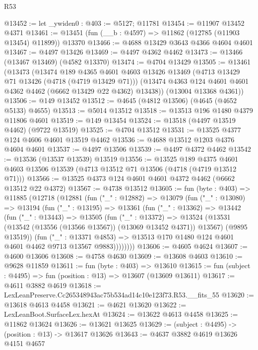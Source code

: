 \begin{lexlean}{R53}
\begin{coremodule}
@13452 := let _ywiden0 : @403 := @5127; @11781
@13454 := @11907 @13452 @4371
@13461 := @13451 (fun (__b : @4597) => @11862 (@12785 (@11903 @13454) @11899)) @13370
@13466 := @4688 @13429 @3643 @4366 @4604 @4601
@13467 := @4497 @13426
@13469 := @4497 @4362 @4462
@13473 := @13466 (@13467 @13469) (@4582 @13370)
@13474 := @4704 @13429
@13505 := @13461
    (@13473
      (@13474
        @189
        @4365
        @4601
        @4603
        @13426
        @13469
        (@4713 @13429 @71 @13426 (@4718 (@4719 @13429 @71)))
        (@13474 @4363 @124 @4601 @4601 @4362 @4462 (@6662 @13429 @22 @4362) @13438))
      (@13004 @13368 @4361))
@13506 := @149 @13452
@13512 := @4645 (@4812 @13506) (@4645 (@4652 @5133) @4655)
@13513 := @5014 @13512
@13518 := @13513 @196 @1480 @4379 @11806 @4601
@13519 := @149 @13454
@13524 := @13518 (@4497 @13519 @4462) (@9722 @13519)
@13525 := @4704 @13512
@13531 := @13525 @4377 @124 @4606 @4601 @13519 @4462
@13536 := @4688 @13512 @1203 @4376 @4604 @4601
@13537 := @4497 @13506
@13539 := @4497 @4372 @4462
@13542 := @13536 (@13537 @13539) @13519
@13556 := @13525
    @189
    @4375
    @4601
    @4603
    @13506
    @13539
    (@4713 @13512 @71 @13506 (@4718 (@4719 @13512 @71)))
@13566 := @13525 @4373 @124 @4601 @4601 @4372 @4462 (@6662 @13512 @22 @4372)
@13567 := @4738 @13512
@13605 := fun (byte : @403) =>
  @11885
    (@12718
      (@12881
        (fun ("_" : @12882) =>
        @13079
          (fun ("_" : @13080) =>
          @13194
            (fun ("_" : @13195) =>
            @13361
              (fun ("_" : @13362) =>
              @13442
                (fun ("_" : @13443) =>
                @13505
                  (fun ("_" : @13372) =>
                  @13524
                    (@13531 (@13542 (@13556 (@13566 @13567)) (@13069 @13452 @4371)) @13567)
                    (@9895 @13519))
                  (fun ("_" : @13371 @4853) =>
                  @13513 @170 @1480 @124 @4601 @4601 @4462 @9713 @13567 @9883))))))))
@13606 := @4605 @4624
@13607 := @4600 @13606
@13608 := @4758 @4630
@13609 := @13608 @4603
@13610 := @9628 @11859
@13611 := fun (byte : @403) => @13610
@13615 := fun (subject : @4495) => fun (position : @13) => @13607 (@13609 @13611)
@13617 := @4611 @3882 @4619
@13618 := LexLeanPreserve.Cc265348943ac75b534ad14c10e123f73.R53.__fits_55
@13620 := @13618 @4613 @4458
@13621 := @4621 @13620
@13622 := LexLeanBoot.SurfaceLex.hexAt
@13624 := @13622 @4613 @4458
@13625 := @11862 @13624
@13626 := @13621 @13625
@13629 := (subject : @4495) -> (position : @13) -> @13617 @13626
@13643 := @4637
    @3882
    @4619
    @13626
    @4151
    @4657

\end{coremodule}
\end{lexlean}
